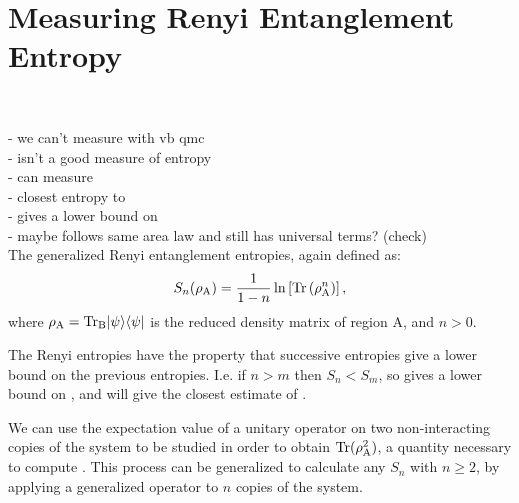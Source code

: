 \chapter{Measuring Renyi Entanglement Entropy}
\\

\noindent
- we can't measure \vn with vb qmc\\
- \vb isn't a good measure of entropy\\
- can measure \re\\
 - closest entropy to \vn\\
 - gives a lower bound on \vn\\
 - maybe follows same area law and still has universal terms? (check)\\
 
The generalized Renyi entanglement entropies, again defined as:
\begin{equation} \label{renyi2}
 	S_n(\rho_{\rm A}) = \frac{1}{1-n}\ln\left[{\rm Tr}\left( \rho_{\rm A}^n \right) \right],
\end{equation}
where $\rho_{\rm{A}}=\rm{Tr}_B\lvert {\psi} \rangle\langle {\psi} \rvert$ is the reduced density matrix of region A, and $n>0$.




The Renyi entropies have the property that successive entropies give a lower bound on the previous entropies.  I.e. if $n>m$ then $S_n<S_m$, so \re gives a lower bound on \vN, and \re will give the closest estimate of \vN.

We can use the expectation value of a unitary \sw operator on two non-interacting copies of the system to be studied in order to obtain ${\rm Tr}(\rho_{\rm A}^2)$, a quantity necessary to compute \re.  
This process can be generalized to calculate any $S_n$ with $n \ge 2$, by applying a generalized \sw operator to $n$ copies of the system. 

